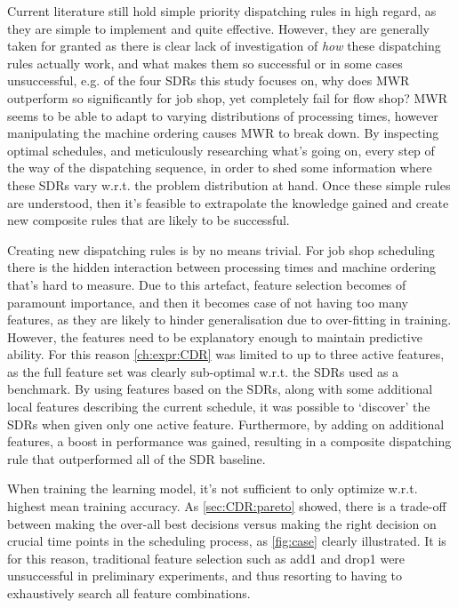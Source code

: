 \documentclass[smallextended]{svjour3}
\begin{document}
Current literature still hold simple priority dispatching rules in high regard, as they are simple to implement and quite effective. However, they are generally taken for granted as there is clear lack of investigation of \emph{how} these dispatching rules actually work, and what makes them so successful or in some cases unsuccessful, e.g. of the four SDRs this study focuses on, why does MWR outperform so significantly for job shop, yet completely fail for flow shop? MWR seems to be able to adapt to varying distributions of processing times, however manipulating the machine ordering causes MWR to break down. By inspecting optimal schedules, and meticulously researching what's going on, every step of the way of the dispatching sequence, in order to shed some information where these SDRs vary w.r.t. the problem distribution at hand. Once these simple rules are understood, then it's feasible to extrapolate the knowledge gained and create new composite rules that are likely to be successful. 

Creating new dispatching rules is by no means trivial. For job shop scheduling there is the hidden interaction between processing times and machine ordering that's hard to measure. Due to this artefact, feature selection becomes of paramount importance, and then it becomes case of not having too many features, as they are likely to hinder generalisation due to over-fitting in training. However, the features need to be explanatory enough to maintain predictive ability. For this reason \cref{ch:expr:CDR} was limited to up to three active features, as the full feature set was clearly sub-optimal w.r.t. the SDRs used as a benchmark. By using features based on the SDRs, along with some additional local features describing the current schedule, it was possible to `discover' the SDRs when given only one active feature. %
Furthermore, by adding on additional features, a boost in performance was gained, resulting in a composite dispatching rule that outperformed all of the SDR baseline. 

When training the learning model, it's not sufficient to only optimize w.r.t. highest mean training accuracy. As \cref{sec:CDR:pareto} showed, there is a trade-off between making the over-all best decisions versus making the right decision on crucial time points in the scheduling process, as \cref{fig:case} clearly illustrated. It is for this reason, traditional feature selection such as add1 and drop1 were unsuccessful in preliminary experiments, and thus resorting to having to exhaustively search all feature combinations.



  

\end{document}
